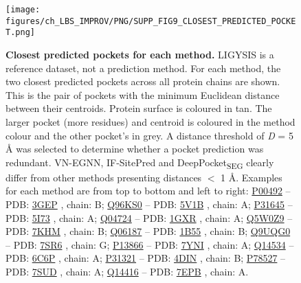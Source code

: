 \begin{figure}[ht!]
    \centering
    \texttt{[image: figures/ch\_LBS\_IMPROV/PNG/SUPP\_FIG9\_CLOSEST\_PREDICTED\_POCKET.png]}
    \caption[Closest predicted pockets for each methods]{\textbf{Closest predicted pockets for each method.} LIGYSIS is a reference dataset, not a prediction method. For each method, the two closest predicted pockets across all protein chains are shown. This is the pair of pockets with the minimum Euclidean distance between their centroids. Protein surface is coloured in tan. The larger pocket (more residues) and centroid is coloured in the method colour and the other pocket's in grey. A distance threshold of \textit{D} = 5 \AA{} was selected to determine whether a pocket prediction was redundant. VN-EGNN, IF-SitePred and DeepPocket\textsubscript{SEG} clearly differ from other methods presenting distances $<$ 1 \AA{}. Examples for each method are from top to bottom and left to right: \href{https://www.uniprot.org/uniprotkb/P00492/entry}{P00492} -- PDB: \href{https://www.ebi.ac.uk/pdbe/entry/pdb/3gep}{3GEP} \cite{KEOUGH_2009_HYPOXAN}, chain: B; \href{https://www.uniprot.org/uniprotkb/Q96KS0/entry}{Q96KS0} -- PDB: \href{https://www.ebi.ac.uk/pdbe/entry/pdb/5v1b}{5V1B} \cite{AHMED_2017_HIF}, chain: A; \href{https://www.uniprot.org/uniprotkb/P31645/entry}{P31645} -- PDB: \href{https://www.ebi.ac.uk/pdbe/entry/pdb/5i73}{5I73} \cite{COLEMAN_2016_SEROTONIN}, chain: A; \href{https://www.uniprot.org/uniprotkb/Q04724/entry}{Q04724} -- PDB: \href{https://www.ebi.ac.uk/pdbe/entry/pdb/1gxr}{1GXR} \cite{PICKLES_2002_WD40}, chain: A; \href{https://www.uniprot.org/uniprotkb/Q5W0Z9/entry}{Q5W0Z9} -- PDB: \href{https://www.ebi.ac.uk/pdbe/entry/pdb/7khm}{7KHM} \cite{CHULJIN_2022_ACYLCOA}, chain: B; \href{https://www.uniprot.org/uniprotkb/Q06187/entry}{Q06187} -- PDB: \href{https://www.ebi.ac.uk/pdbe/entry/pdb/1b55}{1B55} \cite{BARALDI_1999_PH}, chain: B; \href{https://www.uniprot.org/uniprotkb/Q9UQG0/entry}{Q9UQG0} -- PDB: \href{https://www.ebi.ac.uk/pdbe/entry/pdb/7sr6}{7SR6} \cite{BALDWIN_2022_HERVK}, chain: G; \href{https://www.uniprot.org/uniprotkb/P13866/entry}{P13866} -- PDB: \href{https://www.ebi.ac.uk/pdbe/entry/pdb/7yni}{7YNI} \cite{CUI_2023_SGLT}, chain: A; \href{https://www.uniprot.org/uniprotkb/Q14534/entry}{Q14534} -- PDB: \href{https://www.ebi.ac.uk/pdbe/entry/pdb/6c6p}{6C6P} \cite{PADYANA_2019_EPOXIDASE}, chain: A; \href{https://www.uniprot.org/uniprotkb/P31321/entry}{P31321} -- PDB: \href{https://www.ebi.ac.uk/pdbe/entry/pdb/4din}{4DIN} \cite{ILOUZ_2012_PKA}, chain: B; \href{https://www.uniprot.org/uniprotkb/P78527/entry}{P78527} -- PDB: \href{https://www.ebi.ac.uk/pdbe/entry/pdb/7sud}{7SUD} \cite{LIU_2022_DNAPK}, chain: A; \href{https://www.uniprot.org/uniprotkb/Q14416/entry}{Q14416} -- PDB: \href{https://www.ebi.ac.uk/pdbe/entry/pdb/7epb}{7EPB} \cite{DU_2021_MGLU7}, chain: A.}
    \label{fig:closest_pred_pockets}
\end{figure}


